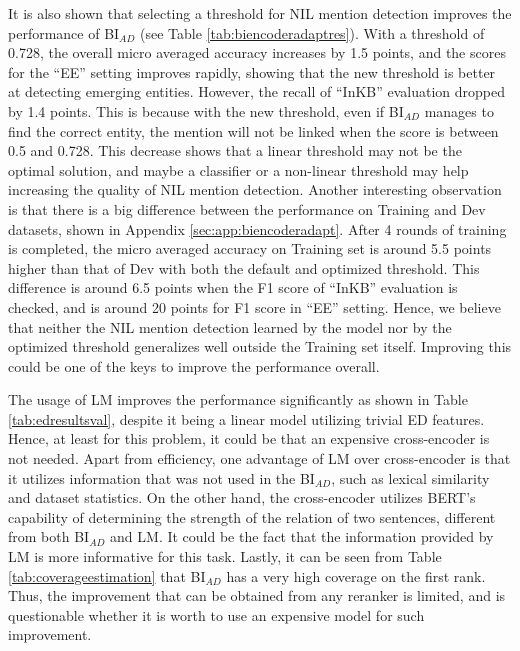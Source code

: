 \documentclass{report}
\theoremstyle{definition}
\theoremstyle{remark}
\begin{document}
It is also shown that selecting a threshold for NIL mention detection improves the performance of BI$_{AD}$ (see Table \ref{tab:biencoderadaptres}). With a threshold of 0.728, the overall micro averaged accuracy increases by 1.5 points, and the scores for the ``EE'' setting improves rapidly, showing that the new threshold is better at detecting emerging entities. However, the recall of ``InKB'' evaluation dropped by 1.4 points. This is because with the new threshold, even if BI$_{AD}$ manages to find the correct entity, the mention will not be linked when the score is between 0.5 and 0.728. This decrease shows that a linear threshold may not be the optimal solution, and maybe a classifier or a non-linear threshold may help increasing the quality of NIL mention detection. Another interesting observation is that there is a big difference between the performance on Training and Dev datasets, shown in Appendix \ref{sec:app:biencoderadapt}. After 4 rounds of training is completed, the micro averaged accuracy on Training set is around 5.5 points higher than that of Dev with both the default and optimized threshold. This difference is around 6.5 points when the F1 score of ``InKB'' evaluation is checked, and is around 20 points for F1 score in ``EE'' setting. Hence, we believe that neither the NIL mention detection learned by the model nor by the optimized threshold generalizes well outside the Training set itself. Improving this could be one of the keys to improve the performance overall.

The usage of LM improves the performance significantly as shown in Table \ref{tab:edresultsval}, despite it being a linear model utilizing trivial ED features. Hence, at least for this problem, it could be that an expensive cross-encoder is not needed. Apart from efficiency, one advantage of LM over cross-encoder is that it utilizes information that was not used in the BI$_{AD}$, such as lexical similarity and dataset statistics. On the other hand, the cross-encoder utilizes BERT's capability of determining the strength of the relation of two sentences, different from both BI$_{AD}$ and LM. It could be the fact that the information provided by LM is more informative for this task. Lastly, it can be seen from Table \ref{tab:coverageestimation} that BI$_{AD}$ has a very high coverage on the first rank. Thus, the improvement that can be obtained from any reranker is limited, and is questionable whether it is worth to use an expensive model for such improvement.
\end{document}
